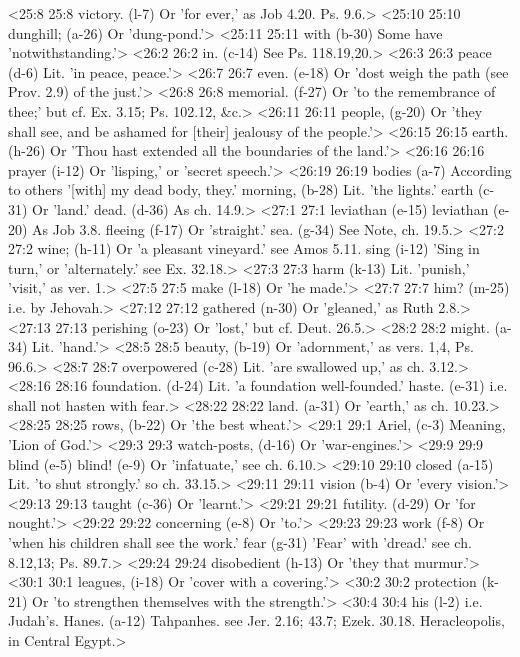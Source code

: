 <25:8 25:8  victory. (l-7)  Or 'for ever,' as Job 4.20. Ps. 9.6.>
<25:10 25:10  dunghill; (a-26)  Or 'dung-pond.'>
<25:11 25:11  with (b-30)  Some have 'notwithstanding.'>
<26:2 26:2  in. (c-14)  See Ps. 118.19,20.>
<26:3 26:3  peace (d-6)  Lit. 'in peace, peace.'>
<26:7 26:7  even. (e-18)  Or 'dost weigh the path (see Prov. 2.9) of the just.'>
<26:8 26:8  memorial. (f-27)  Or 'to the remembrance of thee;' but cf. Ex. 3.15; Ps.  102.12, &c.>
<26:11 26:11  people, (g-20)  Or 'they shall see, and be ashamed for [their] jealousy of  the people.'>
<26:15 26:15  earth. (h-26)  Or 'Thou hast extended all the boundaries of the land.'>
<26:16 26:16  prayer (i-12)  Or 'lisping,' or 'secret speech.'>
<26:19 26:19  bodies (a-7)  According to others '[with] my dead body, they.'
  morning, (b-28)  Lit. 'the lights.'
  earth (c-31)  Or 'land.'
  dead. (d-36)  As ch. 14.9.>
<27:1 27:1  leviathan (e-15)  leviathan (e-20)
  As Job 3.8.
  fleeing (f-17)  Or 'straight.'
  sea. (g-34)  See Note, ch. 19.5.>
<27:2 27:2  wine; (h-11)  Or 'a pleasant vineyard.' see Amos 5.11.
  sing (i-12)  'Sing in turn,' or 'alternately.' see Ex. 32.18.>
<27:3 27:3  harm (k-13)  Lit. 'punish,' 'visit,' as ver. 1.>
<27:5 27:5  make (l-18)  Or 'he made.'>
<27:7 27:7  him? (m-25)  i.e. by Jehovah.>
<27:12 27:12  gathered (n-30)  Or 'gleaned,' as Ruth 2.8.>
<27:13 27:13  perishing (o-23)  Or 'lost,' but cf. Deut. 26.5.>
<28:2 28:2  might. (a-34)  Lit. 'hand.'>
<28:5 28:5  beauty, (b-19)  Or 'adornment,' as vers. 1,4, Ps. 96.6.>
<28:7 28:7  overpowered (c-28)  Lit. 'are swallowed up,' as ch. 3.12.>
<28:16 28:16  foundation. (d-24)  Lit. 'a foundation well-founded.'
  haste. (e-31)  i.e. shall not hasten with fear.>
<28:22 28:22  land. (a-31)  Or 'earth,' as ch. 10.23.>
<28:25 28:25  rows, (b-22)  Or 'the best wheat.'>
<29:1 29:1  Ariel, (c-3)  Meaning, 'Lion of God.'>
<29:3 29:3  watch-posts, (d-16)  Or 'war-engines.'>
<29:9 29:9  blind (e-5)  blind! (e-9)
  Or 'infatuate,' see ch. 6.10.>
<29:10 29:10  closed (a-15)  Lit. 'to shut strongly.' so ch. 33.15.>
<29:11 29:11  vision (b-4)  Or 'every vision.'>
<29:13 29:13  taught (c-36)  Or 'learnt.'>
<29:21 29:21  futility. (d-29)  Or 'for nought.'>
<29:22 29:22  concerning (e-8)  Or 'to.'>
<29:23 29:23  work (f-8)  Or 'when his children shall see the work.'
  fear (g-31)  'Fear' with 'dread.' see ch. 8.12,13; Ps. 89.7.>
<29:24 29:24  disobedient (h-13)  Or 'they that murmur.'>
<30:1 30:1  leagues, (i-18)  Or 'cover with a covering.'>
<30:2 30:2  protection (k-21)  Or 'to strengthen themselves with the strength.'>
<30:4 30:4  his (l-2)  i.e. Judah's.
  Hanes. (a-12)  Tahpanhes. see Jer. 2.16; 43.7; Ezek. 30.18. Heracleopolis,  in Central Egypt.>
